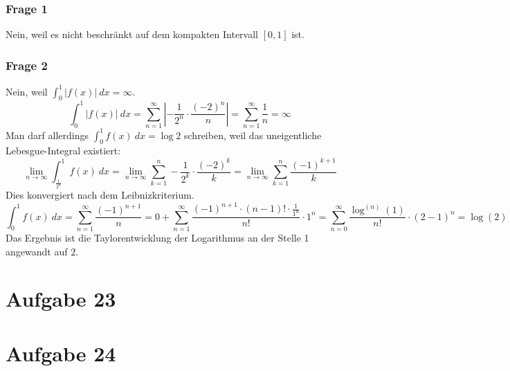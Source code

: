 \documentclass[10pt,a4paper]{article}
\begin{document}
\subsubsection{Frage 1}
Nein, weil es nicht beschränkt auf dem kompakten Intervall $[0, 1]$ ist.

\subsubsection{Frage 2}
Nein, weil $\int_{0}^{1} |f(x)|\ dx = \infty$.
\begin{equation}
  \int_{0}^{1} |f(x)|\ dx = \sum_{n = 1}^{\infty} |- \frac{1}{2^{n}} \cdot \frac{(-2)^{n}}{n}| = \sum_{n = 1}^{\infty} \frac{1}{n} = \infty
\end{equation}
Man darf allerdings $\int_{0}^{1} f(x)\ dx = \log 2$ schreiben, weil das uneigentliche Lebesgue-Integral existiert:
\begin{equation}
  \lim_{n \rightarrow \infty} \int_{\frac{1}{2^{n}}}^{1} f(x)\ dx = \lim_{n \rightarrow \infty} \sum_{k = 1}^{n} - \frac{1}{2^{k}} \cdot \frac{(-2)^{k}}{k} = \lim_{n \rightarrow \infty} \sum_{k = 1}^{n} \frac{(-1)^{k + 1}}{k}
\end{equation}
Dies konvergiert nach dem Leibnizkriterium.
\begin{equation}
  \int_{0}^{1} f(x)\ dx = \sum_{n = 1}^{\infty} \frac{(-1)^{n + 1}}{n} = 0 + \sum_{n = 1}^{\infty} \frac{(-1)^{n + 1} \cdot (n - 1)! \cdot \frac{1}{1^{n}}}{n!} \cdot 1^{n} = \sum_{n = 0}^{\infty} \frac{\log^{(n)}(1)}{n!} \cdot (2 - 1)^{n} = \log(2)
\end{equation}
Das Ergebnis ist die Taylorentwicklung der Logarithmus an der Stelle 1 angewandt auf $2$.

\section{Aufgabe 23}

\section{Aufgabe 24}
\end{document}
